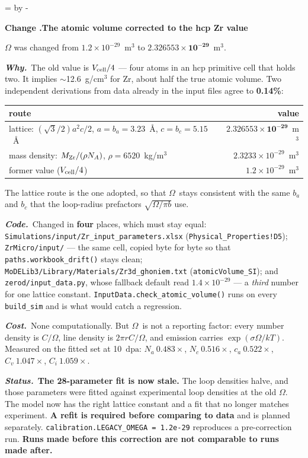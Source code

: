 \documentclass[11pt,a4paper]{article}
\newcommand{\code}[1]{\texttt{\small #1}}
\newcommand{\dpa}{\ensuremath{\mathrm{dpa}}}
\newcommand{\Om}{\ensuremath{\Omega}}
\newcommand{\needlines}[1]{%
  \par\dimen0=\pagegoal \advance\dimen0 by -\pagetotal
  \ifdim\dimen0<#1\baselineskip \newpage \fi}
\newcounter{chg}
\newcommand{\change}[1]{%
  \needlines{4}%
  \refstepcounter{chg}%
  \par\medskip\noindent
  {\bfseries\boldmath Change \thechg.\quad #1}%
  \par\nobreak\smallskip}
\newcommand{\why}[1]{\par\noindent\textbf{\itshape Why.}\ #1\par}
\newcommand{\impact}[1]{\par\noindent\textbf{\itshape Code.}\ #1\par}
\newcommand{\cost}[1]{\par\noindent\textbf{\itshape Cost.}\ #1\par}
\newcommand{\status}[1]{\par\noindent\textbf{\itshape Status.}\ #1\par}
\begin{document}
\change{The atomic volume corrected to the hcp Zr value}
\label{chg:omega}
$\Om$ was changed from $1.2\times10^{-29}$~m$^3$ to
$\mathbf{2.326553\times10^{-29}}$~m$^3$.
\why{The old value is $V_{\rm cell}/4$ --- four atoms in an hcp primitive cell
that holds two. It implies $\sim$12.6~g/cm$^3$ for Zr, about half the true
atomic volume. Two independent derivations from data already in the input
files agree to \textbf{0.14\%}:

\begin{center}
\begin{tabular}{lr}
\toprule
route & value \\
\midrule
lattice: $(\sqrt3/2)a^2c/2$, $a = b_a = 3.23$~\AA, $c = b_c = 5.15$~\AA & $\mathbf{2.326553\times10^{-29}}$~m$^3$ \\
mass density: $M_{\rm Zr}/(\rho N_A)$, $\rho = 6520$~kg/m$^3$ & $2.3233\times10^{-29}$~m$^3$ \\
former value ($V_{\rm cell}/4$) & $1.2\times10^{-29}$~m$^3$ \\
\bottomrule
\end{tabular}
\end{center}

\noindent
The lattice route is the one adopted, so that \Om\ stays consistent with the
same $b_a$ and $b_c$ that the loop-radius prefactors $\sqrt{\Om/\pi b}$ use.}
\impact{Changed in \textbf{four} places, which must stay equal:
\code{Simulations/input/Zr\_input\_parameters.xlsx}
(\code{Physical\_Properties!D5}); \code{ZrMicro/input/} --- the same cell,
copied byte for byte so that \code{paths.workbook\_drift()} stays clean;
\code{MoDELib3/Library/Materials/Zr3d\_ghoniem.txt}
(\code{atomicVolume\_SI}); and \code{zerod/input\_data.py}, whose fallback
default read $1.4\times10^{-29}$ --- a \emph{third} number for one lattice
constant. \code{InputData.check\_atomic\_volume()} runs on every
\code{build\_sim} and is what would catch a regression.}
\cost{None computationally. But \Om\ is not a reporting factor: every number
density is $C/\Om$, line density is $2\pi r C/\Om$, and emission carries
$\exp(\sigma\Om/kT)$. Measured on the fitted set at 10~\dpa:
$N_a\ 0.483\times$, $N_c\ 0.516\times$, $c_a\ 0.522\times$, $C_v\
1.047\times$, $C_i\ 1.059\times$.}
\status{\textbf{The 28-parameter fit is now stale.} The loop densities halve,
and those parameters were fitted against experimental loop densities at the old
\Om. The model now has the right lattice constant and a fit that no longer
matches experiment. \textbf{A refit is required before comparing to data} and
is planned separately. \code{calibration.LEGACY\_OMEGA = 1.2e-29} reproduces a
pre-correction run. \textbf{Runs made before this correction are not
comparable to runs made after.}}
\end{document}
